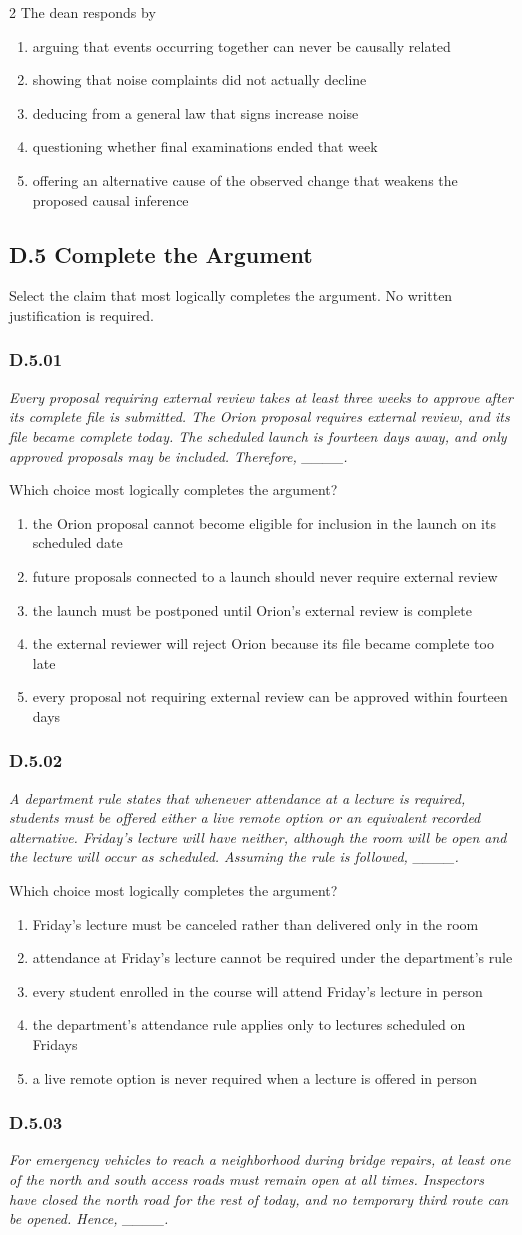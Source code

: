 \documentclass[10pt]{extarticle}
\newcommand{\choice}[1]{\item #1}
\newcommand{\bankitem}[1]{\subsubsection*{#1}}
\begin{document}
\begin{multicols}{2}
The dean responds by
\begin{enumerate}[label=(\alph*)]
  \choice{arguing that events occurring together can never be causally related}
  \choice{showing that noise complaints did not actually decline}
  \choice{deducing from a general law that signs increase noise}
  \choice{questioning whether final examinations ended that week}
  \choice{offering an alternative cause of the observed change that weakens the proposed causal inference}
\end{enumerate}
\subsection*{D.5 Complete the Argument}
Select the claim that most logically completes the argument. No written justification is required.
\bankitem{D.5.01}
\emph{Every proposal requiring external review takes at least three weeks to approve after its complete file is submitted. The Orion proposal requires external review, and its file became complete today. The scheduled launch is fourteen days away, and only approved proposals may be included. Therefore, \_\_\_\_.}

Which choice most logically completes the argument?
\begin{enumerate}[label=(\alph*)]
  \choice{the Orion proposal cannot become eligible for inclusion in the launch on its scheduled date}
  \choice{future proposals connected to a launch should never require external review}
  \choice{the launch must be postponed until Orion's external review is complete}
  \choice{the external reviewer will reject Orion because its file became complete too late}
  \choice{every proposal not requiring external review can be approved within fourteen days}
\end{enumerate}
\bankitem{D.5.02}
\emph{A department rule states that whenever attendance at a lecture is required, students must be offered either a live remote option or an equivalent recorded alternative. Friday's lecture will have neither, although the room will be open and the lecture will occur as scheduled. Assuming the rule is followed, \_\_\_\_.}

Which choice most logically completes the argument?
\begin{enumerate}[label=(\alph*)]
  \choice{Friday's lecture must be canceled rather than delivered only in the room}
  \choice{attendance at Friday's lecture cannot be required under the department's rule}
  \choice{every student enrolled in the course will attend Friday's lecture in person}
  \choice{the department's attendance rule applies only to lectures scheduled on Fridays}
  \choice{a live remote option is never required when a lecture is offered in person}
\end{enumerate}
\bankitem{D.5.03}
\emph{For emergency vehicles to reach a neighborhood during bridge repairs, at least one of the north and south access roads must remain open at all times. Inspectors have closed the north road for the rest of today, and no temporary third route can be opened. Hence, \_\_\_\_.}


\end{multicols}
\end{document}
